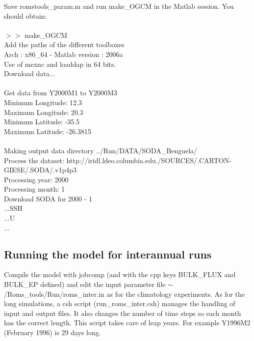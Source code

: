 Save romstools\_param.m and run make\_OGCM in the Matlab session.
You should obtain:
\\\\
$>>$ make\_OGCM\\
Add the paths of the different toolboxes\\
Arch : x86\_64 - Matlab version : 2006a\\
Use of mexnc and loaddap in 64 bits.\\
Download data...\\
\\
Get data from Y2000M1 to Y2000M3\\
Minimum Longitude: 12.3\\
Maximum Longitude: 20.3\\
Minimum Latitude: -35.5\\
Maximum Latitude: -26.3815\\
\\
Making output data directory ../Run/DATA/SODA\_Benguela/\\
Process the dataset: http://iridl.ldeo.columbia.edu./SOURCES/.CARTON-GIESE/.SODA/.v1p4p3\\
Processing year: 2000\\
  Processing month: 1\\
    Download SODA for 2000 - 1\\
    ...SSH\\
    ...U\\
...

\subsection{Running the model for interannual runs}

Compile the model with jobcomp (and with the 
cpp keys BULK\_FLUX and BULK\_EP defined) and edit 
the input parameter file 
$\sim$/Roms\_tools/Run/roms\_inter.in as for the
climatology experiments. As for the long simulations, a csh script
(run\_roms\_inter.csh) manages the handling of input and output files.
It also changes the number of time steps so each month has the correct
length. This script takes care of leap years. For example Y1996M2 
(February 1996) is 29 days long.

